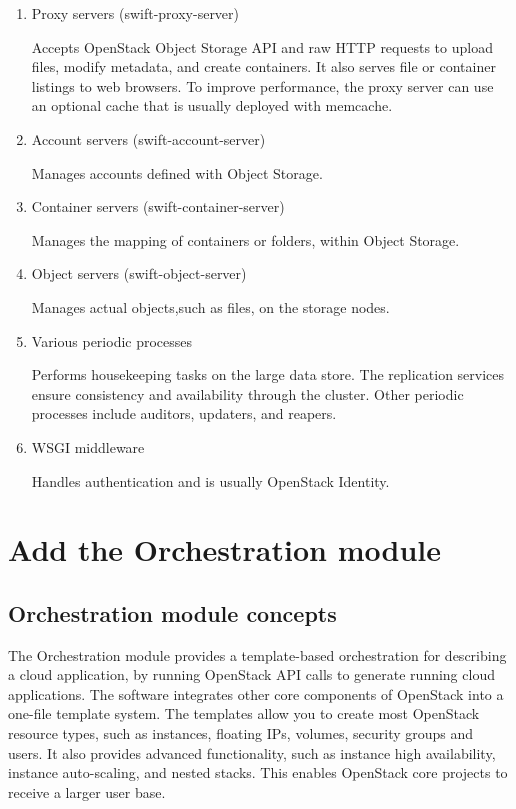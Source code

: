     \begin{enumerate}
        \item Proxy servers (swift-proxy-server)
        \par Accepts OpenStack Object Storage API and raw HTTP requests to upload files, modify metadata, and create containers. It also serves file or container listings to web browsers. To improve performance, the proxy server can use an optional cache that is usually deployed with memcache.
        
        \item Account servers (swift-account-server)
        \par Manages accounts defined with Object Storage.
        
        \item Container servers (swift-container-server)
        \par Manages the mapping of containers or folders, within Object Storage.
        
        \item Object servers (swift-object-server)
        \par Manages actual objects,such as files, on the storage nodes.
        
        \item Various periodic processes
        \par Performs housekeeping tasks on the large data store. The replication services ensure consistency and availability through the cluster. Other periodic processes include auditors, updaters, and reapers.
        
        \item WSGI middleware
        \par Handles authentication and is usually OpenStack Identity.
    \end{enumerate}

\section{Add the Orchestration module}
    \subsection{Orchestration module concepts}

    \par The Orchestration module provides a template-based orchestration for describing a cloud application, by running OpenStack API calls to generate running cloud applications. The software integrates other core components of OpenStack into a one-file template system. The templates allow you to create most OpenStack resource types, such as instances, floating IPs, volumes, security groups and users. It also provides advanced functionality, such as instance high availability, instance auto-scaling, and nested stacks. This enables OpenStack core projects to receive a larger user base.

